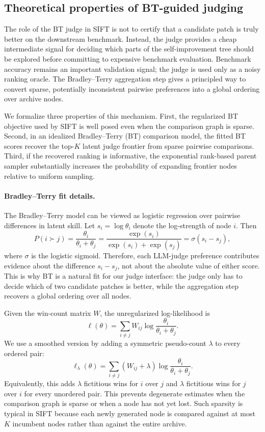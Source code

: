 \documentclass{article}
\begin{document}
\subsection{Theoretical properties of BT-guided judging}

The role of the BT judge in SIFT is not to certify that a candidate patch is
truly better on the downstream benchmark. Instead, the judge provides a cheap
intermediate signal for deciding which parts of the self-improvement tree should
be explored before committing to expensive benchmark evaluation. Benchmark
accuracy remains an important validation signal; the judge is used only as a noisy
ranking oracle. The Bradley--Terry aggregation step gives a principled way to
convert sparse, potentially inconsistent pairwise preferences into a global
ordering over archive nodes.

We formalize three properties of this mechanism. First, the regularized BT
objective used by SIFT is well posed even when the comparison graph is sparse.
Second, in an idealized Bradley--Terry (BT) comparison model, the fitted
BT scores recover the top-$K$ latent judge frontier from sparse pairwise
comparisons. Third, if the recovered ranking is informative, the exponential
rank-based parent sampler substantially increases the probability of expanding
frontier nodes relative to uniform sampling.

\paragraph{Bradley--Terry fit details.}
The Bradley--Terry model can be viewed as logistic regression over pairwise differences in latent skill. Let $s_i = \log \theta_i$ denote the log-strength of node $i$. Then
\[
    P(i \succ j)
    =
    \frac{\theta_i}{\theta_i + \theta_j}
    =
    \frac{\exp(s_i)}{\exp(s_i)+\exp(s_j)}
    =
    \sigma(s_i - s_j),
\]
where $\sigma$ is the logistic sigmoid. Therefore, each LLM-judge preference contributes evidence about the difference $s_i-s_j$, not about the absolute value of either score. This is why BT is a natural fit for our judge interface: the judge only has to decide which of two candidate patches is better, while the aggregation step recovers a global ordering over all nodes.

Given the win-count matrix $W$, the unregularized log-likelihood is
\[
    \ell(\theta)
    =
    \sum_{i \neq j}
    W_{ij}
    \log
    \frac{\theta_i}{\theta_i+\theta_j}.
\]
We use a smoothed version by adding a symmetric pseudo-count $\lambda$ to every ordered pair:
\[
    \ell_\lambda(\theta)
    =
    \sum_{i \neq j}
    (W_{ij}+\lambda)
    \log
    \frac{\theta_i}{\theta_i+\theta_j}.
\]
Equivalently, this adds $\lambda$ fictitious wins for $i$ over $j$ and $\lambda$ fictitious wins for $j$ over $i$ for every unordered pair. This prevents degenerate estimates when the comparison graph is sparse or when a node has not yet lost. Such sparsity is typical in SIFT because each newly generated node is compared against at most $K$ incumbent nodes rather than against the entire archive.
\end{document}
